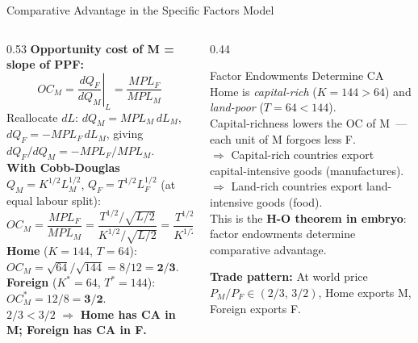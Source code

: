 \documentclass[aspectratio=169]{beamer}
\begin{document}
\begin{frame}[shrink=5]{Comparative Advantage in the Specific Factors Model}
\begin{columns}[T]
\begin{column}{0.53\textwidth}
\textbf{Opportunity cost of M = slope of PPF:}
\[OC_M = \left.\frac{dQ_F}{dQ_M}\right|_L
        = \frac{MPL_F}{MPL_M}\]
Reallocate $dL$: $dQ_M=MPL_M\,dL_M$,
$dQ_F=-MPL_F\,dL_M$, giving $dQ_F/dQ_M = -MPL_F/MPL_M$.\\[0.3em]
\textbf{With Cobb-Douglas} $Q_M=K^{1/2}L_M^{1/2}$,
$Q_F=T^{1/2}L_F^{1/2}$ (at equal labour split):
\[OC_M = \frac{MPL_F}{MPL_M}
        = \frac{T^{1/2}/\!\sqrt{L/2}}{K^{1/2}/\!\sqrt{L/2}}
        = \frac{T^{1/2}}{K^{1/2}}\]
\textbf{Home} ($K=144$, $T=64$):
$OC_M=\sqrt{64}/\sqrt{144}=8/12=\mathbf{2/3}$.\\
\textbf{Foreign} ($K^*=64$, $T^*=144$):
$OC_M^*=12/8=\mathbf{3/2}$.\\[0.2em]
$2/3<3/2$ $\Rightarrow$ \textbf{Home has CA in M;
Foreign has CA in F.}
\end{column}
\begin{column}{0.44\textwidth}
\begin{insight}{Factor Endowments Determine CA}
\footnotesize Home is \emph{capital-rich} ($K=144>64$)
and \emph{land-poor} ($T=64<144$).\\[0.2em]
Capital-richness lowers the OC of M~---
each unit of M forgoes less F.\\[0.2em]
$\Rightarrow$ Capital-rich countries export
capital-intensive goods (manufactures).\\[0.2em]
$\Rightarrow$ Land-rich countries export
land-intensive goods (food).\\[0.2em]
This is the \textbf{H-O theorem in embryo}:
factor endowments determine comparative advantage.
\end{insight}
\vspace{0.2em}
\begin{varbox}
\footnotesize\textbf{Trade pattern:} At world price
$P_M/P_F\in(2/3,\,3/2)$, Home exports M, Foreign
exports F.
\end{varbox}
\end{column}
\end{columns}
\end{frame}

\end{document}
